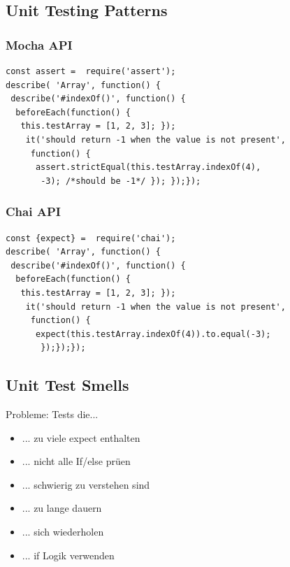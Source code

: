 \subsection{Unit Testing Patterns}



\subsubsection{Mocha API}
\begin{lstlisting}
const assert =  require('assert');
describe( 'Array', function() {
 describe('#indexOf()', function() {
  beforeEach(function() {
   this.testArray = [1, 2, 3]; });
    it('should return -1 when the value is not present',
     function() {
      assert.strictEqual(this.testArray.indexOf(4),
       -3); /*should be -1*/ }); });});
\end{lstlisting}

\subsubsection{Chai API}
\begin{lstlisting}
const {expect} =  require('chai');
describe( 'Array', function() {
 describe('#indexOf()', function() {
  beforeEach(function() {
   this.testArray = [1, 2, 3]; });
    it('should return -1 when the value is not present',
     function() {
      expect(this.testArray.indexOf(4)).to.equal(-3);
       });});});
\end{lstlisting}


\subsection{Unit Test Smells}
Probleme: Tests die...
\begin{itemize}
    \item ... zu viele expect enthalten
    \item ... nicht alle If/else prüen
    \item ... schwierig zu verstehen sind
    \item ... zu lange dauern
    \item ... sich wiederholen
    \item ... if Logik verwenden
\end{itemize}

\vfill
$ $

\columnbreak
